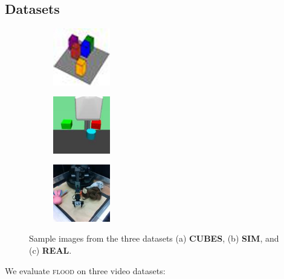 \documentclass{article}
\newcommand{\jd}[1]{\textcolor{orange}{[DJ: #1]}}
\begin{document}
\subsection{Datasets}
\begin{figure}
\begin{subfigure}{.3\linewidth}
\centering
\includegraphics[width=2.5cm]{figs/cubes.jpg}
\caption{}
\label{fig:sub1}
\end{subfigure}%
\begin{subfigure}{.3\linewidth}
\centering
\includegraphics[width=2.5cm]{figs/sim.jpg}
\caption{}
\label{fig:sub2}
\end{subfigure}
\begin{subfigure}{.3\linewidth}
\centering
\includegraphics[width=2.5cm]{figs/real.jpg}
\caption{}
\label{fig:sub3}
\end{subfigure}
\caption{Sample images from the three datasets (a) \textbf{CUBES}, (b) \textbf{SIM}, and (c) \textbf{REAL}.}
\label{fig:datasets}
\end{figure}
We evaluate \textsc{flood} on three video datasets: 
\end{document}
